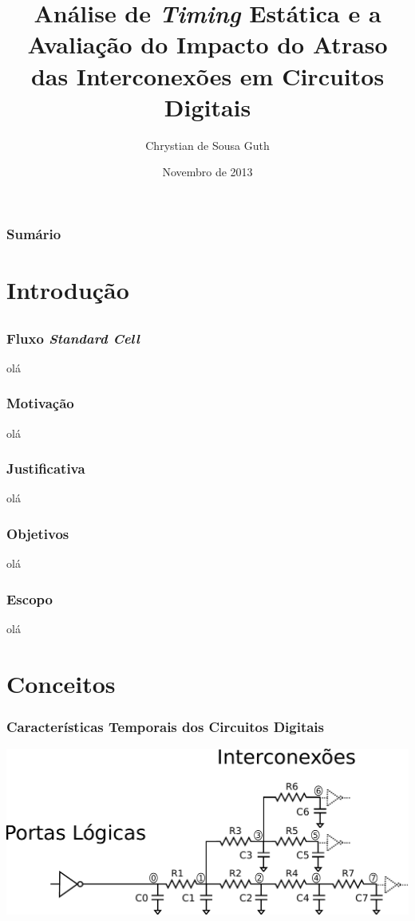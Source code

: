 \documentclass[10pt,a4paper]{beamer}
\title %
{Análise de \textit{Timing} Estática e a Avaliação do Impacto do Atraso das Interconexões em Circuitos Digitais}
\author %
{Chrystian de Sousa Guth}
\institute[UFSC] %
{
  Curso de Bacharelado em Ciências da Computação\\
  Universidade Federal de Santa Catarina

}
\date[nov12] %
{Novembro de 2013}
\begin{document}
	\frame{\titlepage}
	
	\begin{frame}
		\frametitle{Sumário}
		\tableofcontents[]
	\end{frame}

	\section{Introdução}
		
		\subsection*{}
			\begin{frame}
				\frametitle{Fluxo \textit{Standard Cell}}
				olá
			\end{frame}
		
			\begin{frame}
				\frametitle{Motivação}
				olá
			\end{frame}
		
			\begin{frame}
				\frametitle{Justificativa}
				olá
			\end{frame}
		
			\begin{frame}
				\frametitle{Objetivos}
				olá
			\end{frame}
			
			\begin{frame}
				\frametitle{Escopo}
				olá
			\end{frame}
		
	
	\section{Conceitos}
		
		\begin{frame}
		\frametitle{Características Temporais dos Circuitos Digitais}
			\includegraphics[width=\textwidth]{img/circuito.pdf} 
		\end{frame}
\end{document}
